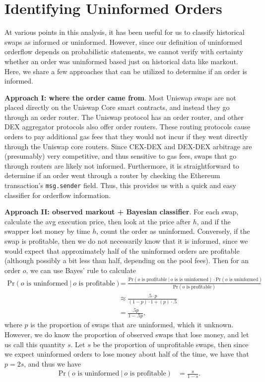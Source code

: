 \section{Identifying Uninformed Orders} \label{appendix:idendify-uninformed}

At various points in this analysis, it has been useful for us to classify historical swaps as informed or uninformed. However, since our definition of uninformed orderflow depends on probabilistic statements, we cannot verify with certainty whether an order was uninformed based just on historical data like markout. Here, we share a few approaches that can be utilized to determine if an order is informed.

\textbf{Approach I: where the order came from}. Most Uniswap swaps are not placed directly on the Uniswap Core smart contracts, and instead they go through an order router. The Uniswap protocol has an order router, and other DEX aggregator protocols also offer order routers. These routing protocols cause orders to pay additional gas fees that they would not incur if they went directly through the Uniswap core routers. Since CEX-DEX and DEX-DEX arbitrage are (presumably) very competitive, and thus sensitive to gas fees, swaps that go through routers are likely not informed. Furthermore, it is straightforward to determine if an order went through a router by checking the Ethereum transaction's \texttt{msg.sender} field. Thus, this provides us with a quick and easy classifier for orderflow information.

\textbf{Approach II: observed markout + Bayesian classifier}. For each swap, calculate the avg execution price, then look at the price after $h$, and if the swapper lost money by time $h$, count the order as uninformed. Conversely, if the swap is profitable, then we do not necessarily know that it is informed, since we would expect that approximately half of the uninformed orders are profitable (although possibly a bit less than half, depending on the pool fees). Then for an order $o$, we can use Bayes' rule to calculate 
    \begin{align*}
        \text{Pr}(o \text{ is uninformed} \ | \ o \text{ is profitable}) 
        & = \frac{\text{Pr}(o \text{ is profitable} \ | \ o \text{ is is uninformed}) \cdot \text{Pr}(o \text{ is uninformed})}{\text{Pr}(o \text{ is profitable})} \\
        & \approx \frac{.5 \cdot p}{(1-p)\cdot 1 + (p) \cdot .5} \\
        & = \frac{.5p}{1-.5p},
    \end{align*}
where $p$ is the proportion of swaps that are uninformed, which it unknown. However, we do know the proportion of observed swaps that lose money, and let us call this quantity $s$. Let $s$ be the proportion of unprofitable swaps, then since we expect uninformed orders to lose money about half of the time, we have that $p=2s$, and thus we have
    \begin{align*}
        \text{Pr}(o \text{ is uninformed} \ | \ o \text{ is profitable})
        & = \frac{s}{1-s}.
    \end{align*}

